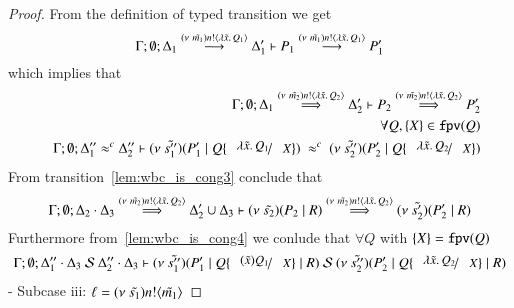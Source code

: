 \begin{proof}
	\noi From the definition of typed transition we get
	\[
		\Gamma; \emptyset; \Delta_1 \stackrel{(\nu\ \tilde{m_1}) n ! \langle \lambda \tilde{x}.\,Q_1 \rangle}{\longrightarrow} \Delta_1' \vdash P_1 \stackrel{(\nu\ \tilde{m_1}) n ! \langle \lambda \tilde{x}.\,Q_1 \rangle}{\longrightarrow} P_1'
	\]
	\noi which implies that
%
	\begin{eqnarray}
		&&\Gamma; \emptyset; \Delta_1 \By{\news{\tilde{m_2}} \bactout{n}{\abs{\tilde{x}}{Q_2}}} \Delta_2' \proves P_2 \By{\news{\tilde{m_2}} \bactout{n}{\abs{\tilde{x}}{Q_2}}} P_2'
		\label{lem:wbc_is_cong3} \\
		&&\forall Q, \set{X} \in \fpv{Q} \nonumber \\
		&&\Gamma; \emptyset; \Delta_1'' \wbc \Delta_2'' \proves \newsp{\tilde{s_1''}}{P_1' \Par Q \subst{\abs{\tilde{x}}{Q_1}}{X}}\ \wbc\ \newsp{\tilde{s_2''}}{P_2' \Par Q \subst{\abs{\tilde{x}}{Q_2}}{X}} \label{lem:wbc_is_cong4}
	\end{eqnarray}
%
	\noi From transition~\ref{lem:wbc_is_cong3} conclude that 
	\[
		\Gamma;\emptyset; \Delta_2 \cdot \Delta_3 \stackrel{(\nu\ \tilde{m_2}) n ! \langle \lambda \tilde{x}.\,Q_2 \rangle}{\Longrightarrow} \Delta_2' \cup \Delta_3 \vdash (\nu\ \tilde{s_2})(P_2 \;|\; R) \stackrel{(\nu\ \tilde{m_2}) n ! \langle \lambda \tilde{x}.\,Q_2 \rangle}{\Longrightarrow} (\nu\ \tilde{s_2'})(P_2' \;|\; R)
	\]
%
	\noi Furthermore from~\ref{lem:wbc_is_cong4} we conlude that $\forall Q$ with $\{X\} = \mathtt{fpv}(Q)$
%
	\[
		\Gamma; \emptyset; \Delta_1'' \cat \Delta_3\ \mathcal{S}\ \Delta_2'' \cat \Delta_3 \proves \newsp{\tilde{s_1''}}{P_1' \Par Q \subst{(\tilde{x}) Q_1}{X} \Par R}\ \mathcal{S}\ \newsp{\tilde{s_2''}}{P_2' \Par Q \subst{\abs{\tilde{x}}{Q_2}}{X} \Par R}
	\]
%
	- Subcase iii: $\ell = (\nu\ \tilde{s_1}) n ! \langle \tilde{m_1} \rangle$


\end{proof}
